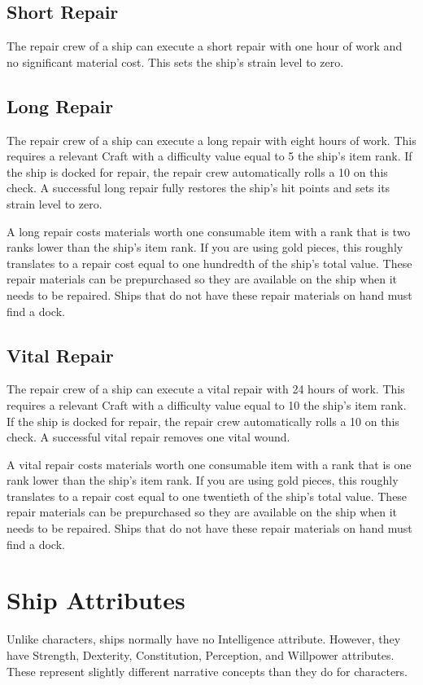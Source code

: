   \subsection{Short Repair}
    The repair crew of a ship can execute a short repair with one hour of work and no significant material cost.
    This sets the ship's strain level to zero.

  \subsection{Long Repair}
    The repair crew of a ship can execute a long repair with eight hours of work.
    This requires a relevant Craft  with a difficulty value equal to 5 \add the ship's item rank.
    If the ship is docked for repair, the repair crew automatically rolls a 10 on this check.
    A successful long repair fully restores the ship's hit points and sets its strain level to zero.

    A long repair costs materials worth one consumable item with a rank that is two ranks lower than the ship's item rank.
    If you are using gold pieces, this roughly translates to a repair cost equal to one hundredth of the ship's total value.
    These repair materials can be prepurchased so they are available on the ship when it needs to be repaired.
    Ships that do not have these repair materials on hand must find a dock.

  \subsection{Vital Repair}
    The repair crew of a ship can execute a vital repair with 24 hours of work.
    This requires a relevant Craft  with a difficulty value equal to 10 \add the ship's item rank.
    If the ship is docked for repair, the repair crew automatically rolls a 10 on this check.
    A successful vital repair removes one vital wound.

    A vital repair costs materials worth one consumable item with a rank that is one rank lower than the ship's item rank.
    If you are using gold pieces, this roughly translates to a repair cost equal to one twentieth of the ship's total value.
    These repair materials can be prepurchased so they are available on the ship when it needs to be repaired.
    Ships that do not have these repair materials on hand must find a dock.

\section{Ship Attributes}\label{Ship Attributes}
  Unlike characters, ships normally have no Intelligence attribute.
  However, they have Strength, Dexterity, Constitution, Perception, and Willpower attributes.
  These represent slightly different narrative concepts than they do for characters.

